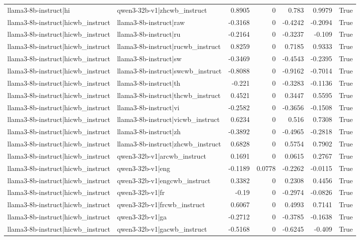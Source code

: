 \begin{table}
\begin{tabular}{l l r r r r l}
llama3-8b-instruct|hi & qwen3-32b-v1|zhcwb_instruct & 0.8905 & 0 & 0.783 & 0.9979 & True \\
llama3-8b-instruct|hicwb_instruct & llama3-8b-instruct|raw & -0.3168 & 0 & -0.4242 & -0.2094 & True \\
llama3-8b-instruct|hicwb_instruct & llama3-8b-instruct|ru & -0.2164 & 0 & -0.3237 & -0.109 & True \\
llama3-8b-instruct|hicwb_instruct & llama3-8b-instruct|rucwb_instruct & 0.8259 & 0 & 0.7185 & 0.9333 & True \\
llama3-8b-instruct|hicwb_instruct & llama3-8b-instruct|sw & -0.3469 & 0 & -0.4543 & -0.2395 & True \\
llama3-8b-instruct|hicwb_instruct & llama3-8b-instruct|swcwb_instruct & -0.8088 & 0 & -0.9162 & -0.7014 & True \\
llama3-8b-instruct|hicwb_instruct & llama3-8b-instruct|th & -0.221 & 0 & -0.3283 & -0.1136 & True \\
llama3-8b-instruct|hicwb_instruct & llama3-8b-instruct|thcwb_instruct & 0.4521 & 0 & 0.3447 & 0.5595 & True \\
llama3-8b-instruct|hicwb_instruct & llama3-8b-instruct|vi & -0.2582 & 0 & -0.3656 & -0.1508 & True \\
llama3-8b-instruct|hicwb_instruct & llama3-8b-instruct|vicwb_instruct & 0.6234 & 0 & 0.516 & 0.7308 & True \\
llama3-8b-instruct|hicwb_instruct & llama3-8b-instruct|zh & -0.3892 & 0 & -0.4965 & -0.2818 & True \\
llama3-8b-instruct|hicwb_instruct & llama3-8b-instruct|zhcwb_instruct & 0.6828 & 0 & 0.5754 & 0.7902 & True \\
llama3-8b-instruct|hicwb_instruct & qwen3-32b-v1|arcwb_instruct & 0.1691 & 0 & 0.0615 & 0.2767 & True \\
llama3-8b-instruct|hicwb_instruct & qwen3-32b-v1|eng & -0.1189 & 0.0778 & -0.2262 & -0.0115 & True \\
llama3-8b-instruct|hicwb_instruct & qwen3-32b-v1|engcwb_instruct & 0.3382 & 0 & 0.2308 & 0.4456 & True \\
llama3-8b-instruct|hicwb_instruct & qwen3-32b-v1|fr & -0.19 & 0 & -0.2974 & -0.0826 & True \\
llama3-8b-instruct|hicwb_instruct & qwen3-32b-v1|frcwb_instruct & 0.6067 & 0 & 0.4993 & 0.7141 & True \\
llama3-8b-instruct|hicwb_instruct & qwen3-32b-v1|ga & -0.2712 & 0 & -0.3785 & -0.1638 & True \\
llama3-8b-instruct|hicwb_instruct & qwen3-32b-v1|gacwb_instruct & -0.5168 & 0 & -0.6245 & -0.409 & True \\

\end{tabular}
\end{table}
